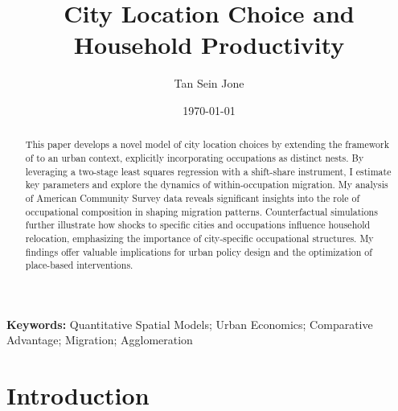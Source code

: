 \documentclass[10pt]{article}
\title{City Location Choice and Household Productivity}
\author{Tan Sein Jone}
\date{\today}
\begin{document}
\doublespacing
\maketitle

\vfill

\begin{abstract}
    This paper develops a novel model of city location choices by extending the framework of \cite{lindandramondo} to an urban context, explicitly incorporating occupations as distinct nests. By leveraging a two-stage least squares regression with a shift-share instrument, I estimate key parameters and explore the dynamics of within-occupation migration. My analysis of American Community Survey data reveals significant insights into the role of occupational composition in shaping migration patterns. Counterfactual simulations further illustrate how shocks to specific cities and occupations influence household relocation, emphasizing the importance of city-specific occupational structures. My findings offer valuable implications for urban policy design and the optimization of place-based interventions.
\end{abstract}

\vfill

\noindent\textbf{Keywords:} Quantitative Spatial Models; Urban Economics; Comparative Advantage; Migration; Agglomeration

\vfill

\newpage

\section{Introduction}

\end{document}
